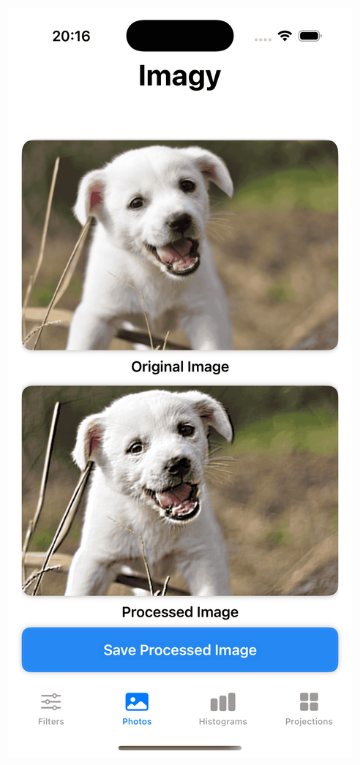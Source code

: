 \documentclass[a4paper]{article}
\begin{document}
\begin{figure}[H]
    \centering
    \begin{subfigure}{0.2\textwidth}
        \centering
        \includegraphics[width=\linewidth]{images/dog_embross_soft.png}

\end{subfigure}
\end{figure}
\end{document}
